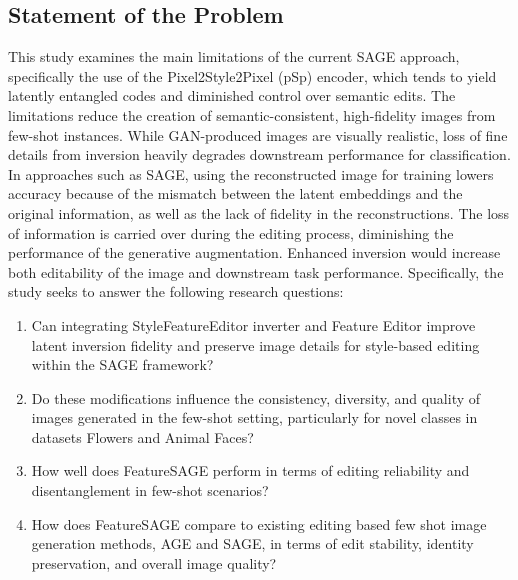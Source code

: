 \subsection{Statement of the Problem}

This study examines the main limitations of the current SAGE approach, specifically the use of the Pixel2Style2Pixel 
(pSp) encoder, which tends to yield latently entangled codes and diminished control over semantic edits. The 
limitations reduce the creation of semantic-consistent, high-fidelity images from few-shot instances. 
While GAN-produced images are visually realistic, loss of fine details from inversion heavily degrades downstream 
performance for classification. In approaches such as SAGE, using the reconstructed image for training lowers accuracy 
because of the mismatch between the latent embeddings and the original information, as well as the lack of fidelity in 
the reconstructions. The loss of information is carried over during the editing process, diminishing the performance of 
the generative augmentation. Enhanced inversion would increase both editability of the image and downstream task performance.
Specifically, the study seeks to answer the following research questions:

\begin{enumerate}%
    \item Can integrating StyleFeatureEditor inverter and Feature Editor improve latent inversion 
    fidelity and preserve image details for style-based editing within the SAGE framework?

    \item Do these modifications influence the consistency, diversity, and quality of images generated in the few-shot 
    setting, particularly for novel classes in datasets Flowers and Animal Faces?

    \item How well does FeatureSAGE perform in terms of editing reliability and disentanglement in few-shot scenarios?

    \item How does FeatureSAGE compare to existing editing based few shot image generation methods, AGE and SAGE, in terms of edit 
    stability, identity preservation, and overall image quality?
    
\end{enumerate}
